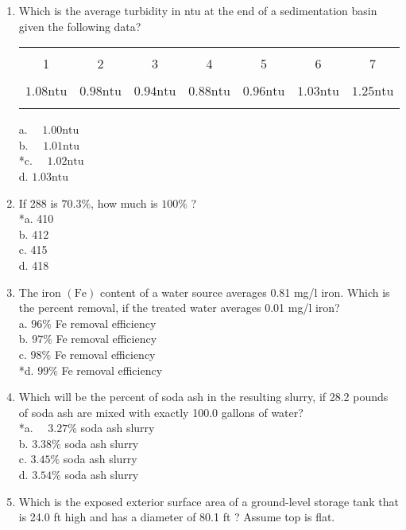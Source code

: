 \begin{enumerate}
\item Which is the average turbidity in ntu at the end of a sedimentation basin given the following data?\\
\begin{center}
\begin{tabular}{|c|c|c|c|c|c|c|}
\hline\\
1 & 2 & 3 & 4 & 5 & 6 & 7 \\\\
\hline\\
$1.08 \mathrm{ntu}$ & $0.98 \mathrm{ntu}$ & $0.94 \mathrm{ntu}$ & $0.88 \mathrm{ntu}$ & $0.96 \mathrm{ntu}$ & $1.03 \mathrm{ntu}$ & $1.25 \mathrm{ntu}$ \\\\
\hline\\
\end{tabular}
\end{center}
a. $\quad 1.00 \mathrm{ntu}$\\
b. $\quad 1.01 \mathrm{ntu}$\\
*c. $\quad 1.02 \mathrm{ntu}$\\
d. $1.03 \mathrm{ntu}$\\
  \item If 288 is $70.3 \%$, how much is $100 \%$ ?\\
*a. 410\\
b. 412\\
c. 415\\
d. 418\\
  \item The iron $(\mathrm{Fe})$ content of a water source averages 0.81 mg/l iron. Which is the percent removal, if the treated water averages 0.01 mg/l iron?\\
a. $96 \%$ Fe removal efficiency\\
b. $97 \%$ Fe removal efficiency\\
c. $98 \%$ Fe removal efficiency\\
*d. $99 \%$ Fe removal efficiency\\
  \item Which will be the percent of soda ash in the resulting slurry, if 28.2 pounds of soda ash are mixed with exactly 100.0 gallons of water?\\
*a. $\quad 3.27 \%$ soda ash slurry\\
b. $3.38 \%$ soda ash slurry\\
c. $3.45 \%$ soda ash slurry\\
d. $3.54 \%$ soda ash slurry\\
  \item Which is the exposed exterior surface area of a ground-level storage tank that is 24.0 ft high and has a diameter of 80.1 ft ? Assume top is flat.\\

\end{enumerate}
